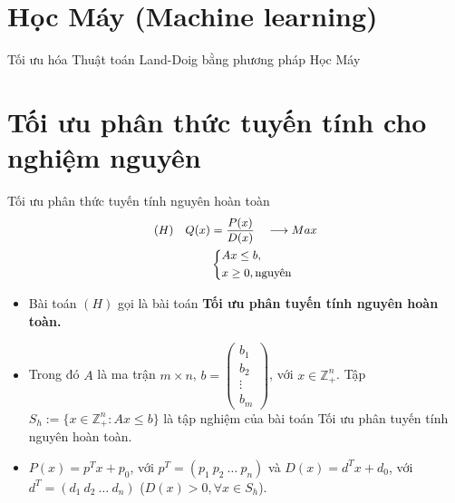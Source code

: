 \documentclass[10pt]{beamer}
\begin{document}
\section*{Học Máy (Machine learning)}

\begin{frame}{Tối ưu hóa Thuật toán Land-Doig bằng phương pháp Học Máy}
    
    \bigskip

\end{frame}

\section*{Tối ưu phân thức tuyến tính cho nghiệm nguyên}







\begin{frame}{Tối ưu phân thức tuyến tính nguyên hoàn toàn}
\begin{equation} \small
    \begin{split}
    (H) \quad Q(x) & = \frac{P(x)}{D(x)} \quad \longrightarrow Max \\
        & \left\{
        \begin{split}
        &Ax \leq  b, \\
        &x \geq 0, \text{nguyên} \\
        \end{split}
        \right.    
    \end{split}
\end{equation}            
\begin{itemize} \small
\item Bài toán $(H)$ gọi là bài toán \textbf{Tối ưu phân tuyến tính nguyên hoàn toàn.}
\item Trong đó $A$ là ma trận $m\times n$, $b=\begin{pmatrix}
    b_1 \\
    b_2 \\
    \vdots \\
    b_m
    \end{pmatrix}$, với $x\in \mathbb{Z}^n_+$. Tập $S_h:=\{x\in \mathbb{Z}^n_+: Ax\leq b\}$ là tập nghiệm của bài toán Tối ưu phân tuyến tính nguyên hoàn toàn. 
\item $P(x)=p^Tx+p_0$, với $p^T = (p_1 \: p_2 \: \ldots \: p_n)$ và $D(x)=d^Tx+d_0$, với $d^T = (d_1 \: d_2 \: \ldots \: d_n)$ ($D(x)>0, \forall x \in S_h$).
\end{itemize}
\end{frame}
\end{document}

